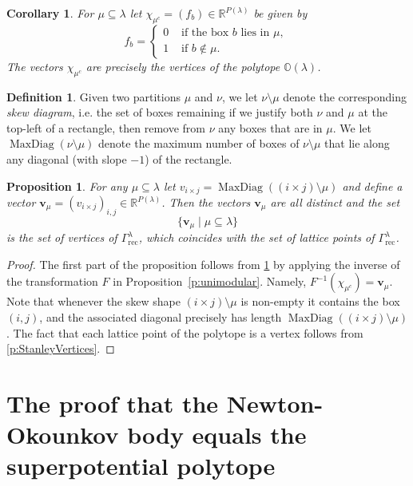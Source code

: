 \documentclass{amsart}
\newtheorem{corollary}[thm]{Corollary}
\newtheorem{proposition}[thm]{Proposition}
\theoremstyle{definition}
\newtheorem{definition}[thm]{Definition}
\numberwithin{equation}{section}
\newcommand{\R}{\mathbb R}
\newcommand{\Q}{\Gamma}
\newcommand{\rect}{\mathrm{rec}}
\newcommand{\OO}{\mathbb{O}}
\newcommand{\inv}{^{-1}}
\newcommand{\maxdiag}{{\operatorname{MaxDiag}}}
\begin{document}
 \begin{corollary}\label{c:VerticesOfO}
For $\mu\subseteq\lambda$ let $\chi_{\mu^c}=(f_b)\in\R^{P(\lambda)}$ be given by 
\begin{equation*}
f_b=\begin{cases} 0 &
 \text{ if the box $b$ lies in $\mu$, }\\ 
 1 & \text{ if $b\notin\mu$.} 
 \end{cases}
\end{equation*}
The vectors $\chi_{\mu^c}$ are precisely the vertices of the polytope $\OO(\lambda)$.
\end{corollary}

\begin{definition}\label{d:MaxDiagVectors}\cite[Definition 14.3]{RW} 
Given two partitions $\mu$ and $\nu$, we let 
$\nu \setminus \mu$ denote the corresponding 
	\emph{skew diagram}, i.e. the set of boxes remaining
	if we justify both $\nu$ and $\mu$ at the top-left of 
	a rectangle, then remove from $\nu$ any boxes that 
	are in $\mu$.  We let 
	 $\maxdiag(\nu\setminus \mu)$ denote the maximum
	 number of boxes of $\nu \setminus \mu$ that lie 
	 along any diagonal (with slope $-1$) of the rectangle.
\end{definition}

\begin{proposition}\label{l:VerticesOfGamma}
For any $\mu\subseteq\lambda$ let 
$v_{i\times j}=\maxdiag((i\times j)\setminus\mu)$
and define a vector 
$\mathbf v_\mu=(v_{i\times j})_{i,j}\in \R^{P(\lambda)}$.
Then the vectors $\mathbf v_\mu$ 
are all distinct and the set 
\[
\{\mathbf v_\mu\mid\mu\subseteq\lambda\}
\] 
is the set of vertices of 
	$\Q^{\lambda}_{{\rect}}$, 
	which coincides with the set of 
lattice points of 
	$\Q^{\lambda}_{{\rect}}$.
\end{proposition}
\begin{proof}
The first part of the proposition
follows from \cref{c:VerticesOfO} by applying the inverse of the transformation $F$ in Proposition~\ref{p:unimodular}. Namely, $F\inv(\chi_{\mu^c})=\mathbf v_{\mu}$. Note that whenever the skew shape $(i\times j)\setminus\mu$ is non-empty it contains the box $(i,j)$, and the associated diagonal precisely has length $\maxdiag((i\times j)\setminus\mu)$.  The fact that each lattice point of the polytope is a vertex follows from 
	\cref{p:StanleyVertices}.
\end{proof}




\section{The proof that the Newton-Okounkov body equals the superpotential polytope}\label{sec:polytopescoincide}
\end{document}
